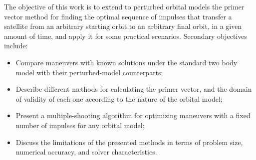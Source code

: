 The objective of this work is to extend to perturbed orbital models the primer vector method for finding the optimal sequence of impulses that transfer a satellite from an arbitrary starting orbit to an arbitrary final orbit, in a given amount of time, and apply it for some practical scenarios. Secondary objectives include:
\begin{itemize}
    \item Compare maneuvers with known solutions under the standard two body model with their perturbed-model counterparts;
    \item Describe different methods for calculating the primer vector, and the domain of validity of each one according to the nature of the orbital model;
    \item Present a multiple-shooting algorithm for optimizing maneuvers with a fixed number of impulses for any orbital model;
    \item Discuss the limitations of the presented methods in terms of problem size, numerical accuracy, and solver characteristics.
\end{itemize}




